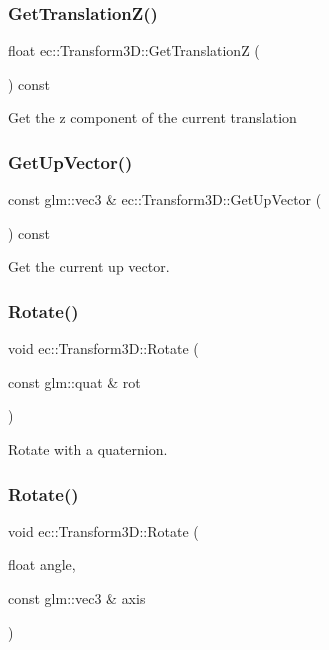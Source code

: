 \subsubsection{\texorpdfstring{Get\+Translation\+Z()}{GetTranslationZ()}}
{\footnotesize\ttfamily float ec\+::\+Transform3\+D\+::\+Get\+TranslationZ (\begin{DoxyParamCaption}{ }\end{DoxyParamCaption}) const}

Get the z component of the current translation \mbox{\label{classec_1_1_transform3_d_ace4e850baa2cbbbbcbe12613eb6851a8}} 
\subsubsection{\texorpdfstring{Get\+Up\+Vector()}{GetUpVector()}}
{\footnotesize\ttfamily const glm\+::vec3 \& ec\+::\+Transform3\+D\+::\+Get\+Up\+Vector (\begin{DoxyParamCaption}{ }\end{DoxyParamCaption}) const}

Get the current up vector. \mbox{\label{classec_1_1_transform3_d_ae2675da2f17fe145cc199412d85777d5}} 
\subsubsection{\texorpdfstring{Rotate()}{Rotate()}\hspace{0.1cm}{\footnotesize\ttfamily [1/2]}}
{\footnotesize\ttfamily void ec\+::\+Transform3\+D\+::\+Rotate (\begin{DoxyParamCaption}\item[{const glm\+::quat \&}]{rot }\end{DoxyParamCaption})}

Rotate with a quaternion. \mbox{\label{classec_1_1_transform3_d_acaaea3ccdff9e23f1edf6f9fed054afe}} 
\subsubsection{\texorpdfstring{Rotate()}{Rotate()}\hspace{0.1cm}{\footnotesize\ttfamily [2/2]}}
{\footnotesize\ttfamily void ec\+::\+Transform3\+D\+::\+Rotate (\begin{DoxyParamCaption}\item[{float}]{angle,  }\item[{const glm\+::vec3 \&}]{axis }\end{DoxyParamCaption})}

